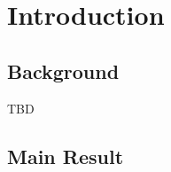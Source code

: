 \documentclass[12pt,a4paper]{amsart}
\numberwithin{equation}{section}
\theoremstyle{plain}
\theoremstyle{definition}
\theoremstyle{remark}
\begin{document}
\section{Introduction}
\subsection{Background}
\begin{comment}
The study of the extinction of populations is of a great interest in biology. Conditioning on non-extinction can not only notably lead to a stationary behavior
of the process, but also provides a lot of information about the evolution of the population before extinction.  As far as the population dynamics which are extinct in finite time running over large amounts of time are concerned, special attentions are given to two conditional limits: one type of limits are the Yaglom distributions and the related quasi-stationary distributions, the other type of limits are the Q processes.   There are plenty of literatures investigating these properties of branching processes. See, for instance, Athreya and Ney \cite[pages 64-65]{AthreyaNey1972Branching},Grey\cite{Grey1974Asymptotic},Lyons, Pemantle and Peres \cite{LyonsPemantlePeres1995Conceptual}, Seneta and
Vere-Jones \cite{Heathcote},Heathcote,Joffe \cite{Joffe}, Yaglom \cite{Yaglom47} for Galton-Watson branching processes, Lambert\cite{Lambert2001Arbres, Lambert2003Coalescence},Li\cite[Theorem 4.3]{Li00} for continuous state and continuous time branching processes. Asmussen and Hering \cite{AH} studied limit behaviour of subcritical branching Markov processes, in which each particle  lives for exponential time, then give birth to random number of particles, and particles move as independent
Markov processes in between branching times and it is assume that  the life times, reproduction of different individuals is independent.

  In the authors' paper \cite{LSYS}, the Yaglom distributions of the superprocesses are investigated.  In
  this paper, we are mainly studying the properties of the Q processes for superprocesses and discover their relationships with the Yaglom distributions..
\end{comment}
TBD %
\subsection{Main Result}\label{model}
\end{document}
